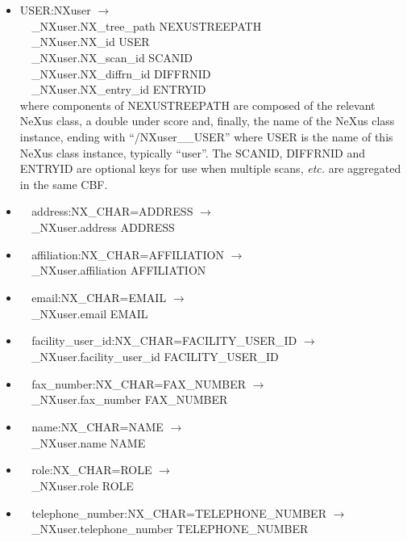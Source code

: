 \documentclass[11pt]{article}
\begin{document}
{{\begin{itemize}

\item{USER:NXuser $\rightarrow$\\
\verb|  |\_NXuser.NX\_tree\_path    NEXUSTREEPATH \\
\verb|  |\_NXuser.NX\_id            USER \\
\verb|  |\_NXuser.NX\_scan\_id      SCANID \\
\verb|  |\_NXuser.NX\_diffrn\_id    DIFFRNID \\
\verb|  |\_NXuser.NX\_entry\_id     ENTRYID \\
where components of NEXUSTREEPATH are composed of the
relevant NeXus class, a double under score and, finally, the
name of the NeXus class instance, ending with ``/NXuser\_\_USER''
where USER is the name of this NeXus class instance, typically ``user''.
The SCANID, DIFFRNID and ENTRYID are optional keys for use
when multiple scans, {\it etc.} are aggregated in the same CBF.}

\item{\verb|  |address:NX\_CHAR=ADDRESS $\rightarrow$\\
\verb|  |\_NXuser.address ADDRESS}

\item{\verb|  |affiliation:NX\_CHAR=AFFILIATION $\rightarrow$\\
\verb|  |\_NXuser.affiliation AFFILIATION}

\item{\verb|  |email:NX\_CHAR=EMAIL $\rightarrow$\\
\verb|  |\_NXuser.email EMAIL}

\item{\verb|  |facility\_user\_id:NX\_CHAR=FACILITY\_USER\_ID $\rightarrow$\\
\verb|  |\_NXuser.facility\_user\_id FACILITY\_USER\_ID}

\item{\verb|  |fax\_number:NX\_CHAR=FAX\_NUMBER $\rightarrow$\\
\verb|  |\_NXuser.fax\_number FAX\_NUMBER}

\item{\verb|  |name:NX\_CHAR=NAME $\rightarrow$\\
\verb|  |\_NXuser.name NAME}

\item{\verb|  |role:NX\_CHAR=ROLE $\rightarrow$\\
\verb|  |\_NXuser.role ROLE}

\item{\verb|  |telephone\_number:NX\_CHAR=TELEPHONE\_NUMBER $\rightarrow$\\
\verb|  |\_NXuser.telephone\_number TELEPHONE\_NUMBER}
\end{itemize}
}}
\end{document}
